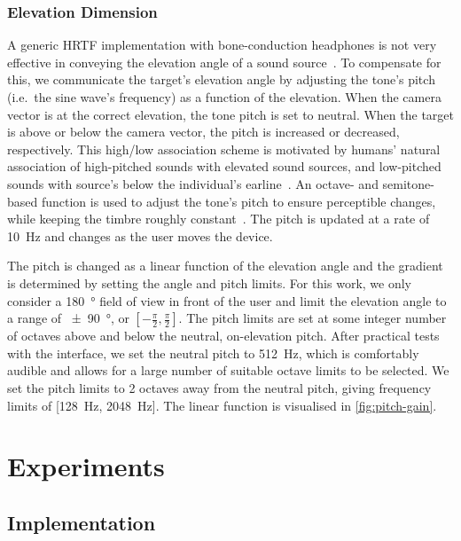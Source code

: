 \documentclass{article}
\begin{document}
\subsubsection{Elevation Dimension}

A generic HRTF implementation with bone-conduction headphones is not very effective in conveying the elevation angle of a sound source~\cite{macdonald2006spatial,schonstein2008comparison}.
To compensate for this, we communicate the target's elevation angle by adjusting the tone's pitch (i.e.\ the sine wave's frequency) as a function of the elevation. 
When the camera vector is at the correct elevation, the tone pitch is set to neutral.
When the target is above or below the camera vector, the pitch is increased or decreased, respectively.
This high/low association scheme is motivated by humans' natural association of high-pitched sounds with elevated sound sources, and low-pitched sounds with source's below the individual's earline~\cite{pratt1930spatial,blauert1997spatial}.
An octave- and semitone-based function is used to adjust the tone's pitch to ensure perceptible changes, while keeping the timbre roughly constant~\cite{shepard1964circularity}.
The pitch is updated at a rate of \SI{10}{\hertz} and changes as the user moves the device.

The pitch is changed as a linear function of the elevation angle and the gradient is determined by setting the angle and pitch limits.
For this work, we only consider a \SI{180}{\degree} field of view in front of the user and limit the elevation angle to a range of \SI{\pm90}{\degree}, or $[-\frac{\pi}{2}, \frac{\pi}{2}]$.
The pitch limits are set at some integer number of octaves above and below the neutral, on-elevation pitch.
After practical tests with the interface, we set the neutral pitch to \SI{512}{\hertz}, which is comfortably audible and allows for a large number of suitable octave limits to be selected.
We set the pitch limits to 2 octaves away from the neutral pitch, giving frequency limits of [\SI{128}{\hertz}, \SI{2048}{\hertz}].
The linear function is visualised in \cref{fig:pitch-gain}.

\section{Experiments}\label{sec:experiments}

\subsection{Implementation}
\end{document}
